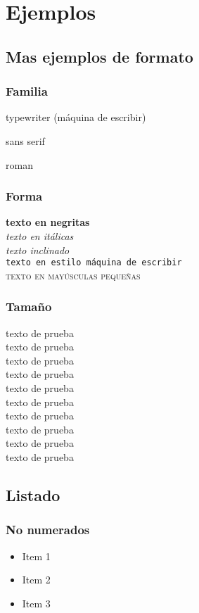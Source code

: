 \chapter{Ejemplos}

\section{Mas ejemplos de formato}
\subsection{Familia}

{\ttfamily typewriter (máquina de escribir)}

{\sffamily sans serif}

{\rmfamily roman}

\subsection{Forma}
\textbf{texto en negritas}\\
\textit{texto en itálicas}\\
\textsl{texto inclinado}\\
\texttt{texto en estilo máquina de escribir}\\
\textsc{texto en mayúsculas pequeñas}

\subsection{Tamaño}
{\tiny texto de prueba}\\
{\scriptsize texto de prueba}\\
{\footnotesize texto de prueba}\\
{\small texto de prueba}\\
{\normalsize texto de prueba}\\
{\large texto de prueba}\\
{\Large texto de prueba}\\
{\LARGE texto de prueba}\\
{\huge texto de prueba}\\
{\Huge texto de prueba}

\section{Listado}

\subsection{No numerados}
\begin{itemize}
    \item Item 1
    \item Item 2
    \item Item 3
\end{itemize}


